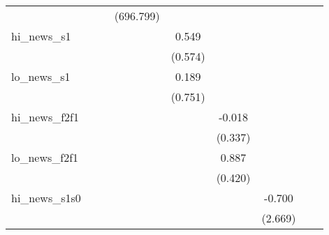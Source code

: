 {\begin{tabular}{l*{8}{c}}
            &                     &                     &   (696.799)         &                     &                     &                     &                     &                     \\
\addlinespace
hi\_news\_s1  &                     &                     &                     &       0.549         &                     &                     &                     &                     \\
            &                     &                     &                     &     (0.574)         &                     &                     &                     &                     \\
\addlinespace
lo\_news\_s1  &                     &                     &                     &       0.189         &                     &                     &                     &                     \\
            &                     &                     &                     &     (0.751)         &                     &                     &                     &                     \\
\addlinespace
hi\_news\_f2f1&                     &                     &                     &                     &      -0.018         &                     &                     &                     \\
            &                     &                     &                     &                     &     (0.337)         &                     &                     &                     \\
\addlinespace
lo\_news\_f2f1&                     &                     &                     &                     &       0.887\sym{**} &                     &                     &                     \\
            &                     &                     &                     &                     &     (0.420)         &                     &                     &                     \\
\addlinespace
hi\_news\_s1s0&                     &                     &                     &                     &                     &      -0.700         &                     &                     \\
            &                     &                     &                     &                     &                     &     (2.669)         &                     &                     \\

\end{tabular}}
